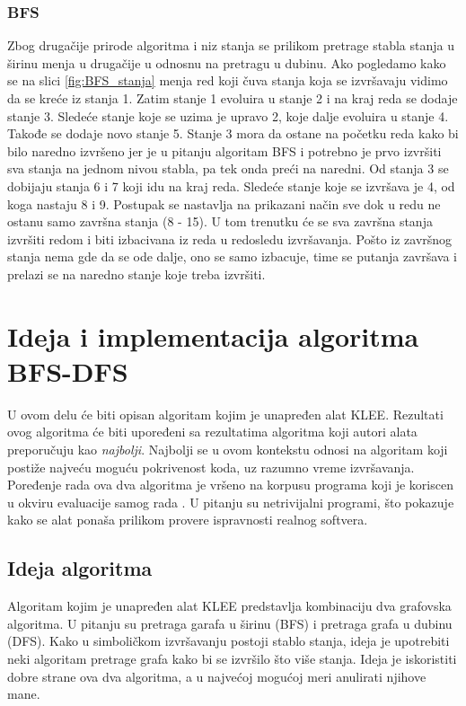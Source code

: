 \documentclass[12pt,oneside]{memoir}
\begin{document}
\subsection{BFS} 
Zbog drugačije prirode algoritma i niz stanja se prilikom pretrage stabla stanja u širinu menja u drugačije u odnosnu na pretragu u dubinu. Ako pogledamo kako se na slici \ref{fig:BFS_stanja} menja red koji čuva stanja koja se izvršavaju vidimo da se kreće iz stanja 1. Zatim stanje 1 evoluira u stanje 2 i na kraj reda se dodaje stanje 3. Sledeće stanje koje se uzima je upravo 2, koje dalje evoluira u stanje 4. Takođe se dodaje novo stanje 5. Stanje 3 mora da ostane na početku reda kako bi bilo naredno izvršeno jer je u pitanju algoritam BFS i potrebno je prvo izvršiti sva stanja na jednom nivou stabla, pa tek onda preći na naredni. Od stanja 3 se dobijaju stanja 6 i 7 koji idu na kraj reda. Sledeće stanje koje se izvršava je 4, od koga nastaju 8 i 9. Postupak se nastavlja na prikazani način sve dok u redu ne ostanu samo završna stanja (8 - 15). U tom trenutku će se sva završna stanja izvršiti redom i biti izbacivana iz reda u redosledu izvršavanja. Pošto iz završnog stanja nema gde da se ode dalje, ono se samo izbacuje, time se putanja završava i prelazi se na naredno stanje  koje treba izvršiti.
\chapter{Ideja i implementacija algoritma BFS-DFS} \label{algoritam}
U ovom delu će biti opisan algoritam kojim je unapređen alat KLEE. Rezultati ovog algoritma će biti upoređeni sa rezultatima algoritma koji autori alata preporučuju kao \textit{najbolji}. Najbolji se u ovom kontekstu odnosi na algoritam koji postiže najveću moguću pokrivenost koda, uz razumno vreme izvršavanja. Poređenje rada ova dva algoritma je vršeno na korpusu programa koji je koriscen u okviru evaluacije samog rada \cite{klee}. U pitanju su netrivijalni programi, što pokazuje kako se alat ponaša prilikom provere ispravnosti realnog softvera.

\section{Ideja algoritma}
Algoritam kojim je unapređen alat KLEE predstavlja kombinaciju dva grafovska algoritma. U pitanju su pretraga garafa u širinu (BFS) i pretraga grafa u dubinu (DFS). Kako u simboličkom izvršavanju postoji stablo stanja, ideja je upotrebiti neki algoritam pretrage grafa kako bi se izvršilo što više stanja. Ideja je iskoristiti dobre strane ova dva algoritma, a u najvećoj mogućoj meri anulirati njihove mane. 
\end{document}
